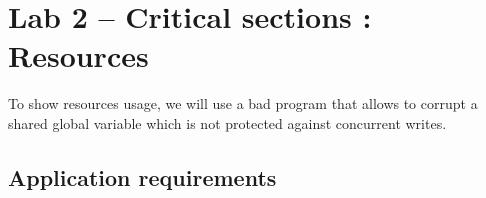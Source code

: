 \documentclass[11pt]{report}
\newtheorem{ex}{Question}
\begin{document}
%
%
%
%
%
%
%
\chapter{Lab 2 -- Critical sections : Resources}

To show resources usage, we will use a bad program that allows to corrupt a shared global variable which is not protected against concurrent writes. 


\section{Application requirements}
\end{document}
